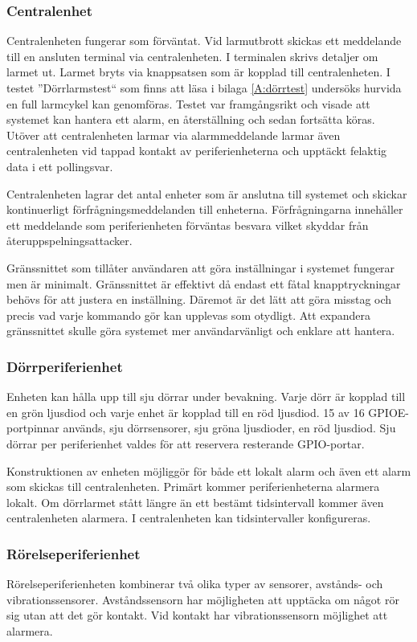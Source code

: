 \documentclass[a4paper]{article}
\begin{document}
\subsubsection{Centralenhet}
Centralenheten fungerar som förväntat.
Vid larmutbrott skickas ett meddelande till en ansluten terminal via centralenheten.
I terminalen skrivs detaljer om larmet ut.
Larmet bryts via knappsatsen som är kopplad till centralenheten.
I testet ''Dörrlarmstest`` som finns att läsa i bilaga \ref{A:dörrtest} undersöks hurvida en full larmcykel kan genomföras.
Testet var framgångsrikt och visade att systemet kan hantera ett alarm, en återställning och sedan fortsätta köras.
Utöver att centralenheten larmar via alarmmeddelande larmar även centralenheten vid tappad kontakt av periferienheterna och upptäckt felaktig data i ett pollingsvar.

Centralenheten lagrar det antal enheter som är anslutna till systemet och skickar kontinuerligt förfrågningsmeddelanden till enheterna.
Förfrågningarna innehåller ett meddelande som periferienheten förväntas besvara vilket skyddar från återuppspelningsattacker.

Gränssnittet som tillåter användaren att göra inställningar i systemet fungerar men är minimalt.
Gränssnittet är effektivt då endast ett fåtal knapptryckningar behövs för att justera en inställning.
Däremot är det lätt att göra misstag och precis vad varje kommando gör kan upplevas som otydligt.
Att expandera gränssnittet skulle göra systemet mer användarvänligt och enklare att hantera.

\subsubsection{Dörrperiferienhet}
Enheten kan hålla upp till sju dörrar under bevakning.
Varje dörr är kopplad till en grön ljusdiod och varje enhet är kopplad till en röd ljusdiod.
15 av 16 GPIOE-portpinnar används, sju dörrsensorer, sju gröna ljusdioder, en röd ljusdiod.
Sju dörrar per periferienhet valdes för att reservera resterande GPIO-portar.

Konstruktionen av enheten möjliggör för både ett lokalt alarm och även ett alarm som skickas till centralenheten.
Primärt kommer periferienheterna alarmera lokalt.
Om dörrlarmet stått längre än ett bestämt tidsintervall kommer även centralenheten alarmera.
I centralenheten kan tidsintervaller konfigureras.

\subsubsection{Rörelseperiferienhet}
Rörelseperiferienheten kombinerar två olika typer av sensorer, avstånds- och vibrationssensorer.
Avståndssensorn har möjligheten att upptäcka om något rör sig utan att det gör kontakt.
Vid kontakt har vibrationssensorn möjlighet att alarmera.
\end{document}
